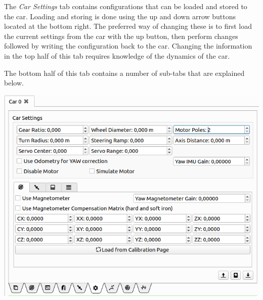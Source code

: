\documentclass[12pt]{article} %
\begin{document}
\noindent\begin{minipage}{0.5\textwidth} %

The {\em Car Settings} tab contains configurations that can be loaded
and stored to the car. Loading and storing is done using the up and
down arrow buttons located at the bottom right. The preferred way of
changing these is to first load the current settings from the car with
the up button, then perform changes followed by writing the
configuration back to the car. Changing the information in the top
half of this tab requires knowledge of the dynamics of the car.

The bottom half of this tab contains a number of sub-tabs that are
explained below.
\end{minipage}
\begin{minipage}{0.5\textwidth}
  \noindent \includegraphics[width=\textwidth]{./screens/Car_configuration.png}
\end{minipage}
\end{document}
